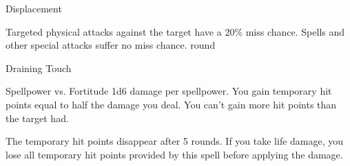 \begin{spellsection}[Lesser]{Displacement}
    \begin{spellheader}
    \end{spellheader}
    \begin{spellcontent}
        \begin{spelltargetinginfo}
        \end{spelltargetinginfo}
        \begin{spelleffects}
            \spelleffect Targeted physical attacks against the target have a 20\% miss chance. Spells and other special attacks suffer no miss chance.
             round
        \end{spelleffects}
    \end{spellcontent}
    \begin{spellfooter}
    \end{spellfooter}
\end{spellsection}

\begin{spellsection}{Draining Touch}
    \begin{spellheader}
    \end{spellheader}
    \begin{spellcontent}
        \begin{spelltargetinginfo}
        \end{spelltargetinginfo}
        \begin{spelleffects}
            \begin{spellattack}{Spellpower vs. Fortitude}
                \spellsuccess 1d6 damage  per spellpower. You gain temporary hit points equal to half the damage you deal. You can't gain more hit points than the target had.
                
                The temporary hit points disappear after 5 rounds. If you take life damage, you lose all temporary hit points provided by this spell before applying the damage.
            \end{spellattack}
        \end{spelleffects}
    \end{spellcontent}
    \begin{spellfooter}
    \end{spellfooter}
\end{spellsection}

